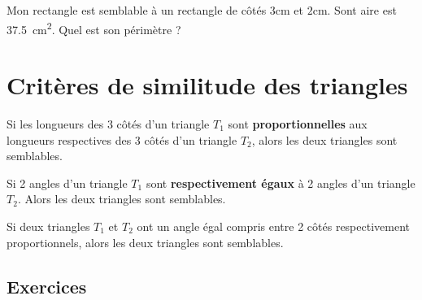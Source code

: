 \documentclass[main.tex]{subfiles}
\begin{document}
\begin{exercise} 
	Mon rectangle est semblable à un rectangle de côtés $3$\si{\centi\meter} et $2$\si{\centi\meter}. Sont aire est \SI{37.5}{\centi\meter^2}. Quel est son périmètre ?
\end{exercise}
% 

\newpage 
{}  
\pagestyle{scrheadings} %
\onehalfspacing  
\section{Critères de similitude des triangles}

\begin{postulat} Si les longueurs des 3 côtés d'un triangle $T_1$ sont \textbf{proportionnelles} aux longueurs respectives des 3 côtés d'un triangle $T_2$, alors les deux triangles sont semblables.
\end{postulat}
\begin{postulat} Si 2 angles d'un triangle $T_1$ sont \textbf{respectivement égaux} à 2 angles d'un triangle $T_2$. Alors les deux triangles sont semblables.  
\end{postulat}

\begin{postulat} Si deux triangles $T_1$ et $T_2$ ont un angle égal compris entre 2 côtés respectivement proportionnels, alors les deux triangles sont semblables.  
\end{postulat}


\subsection{Exercices}
\end{document}
